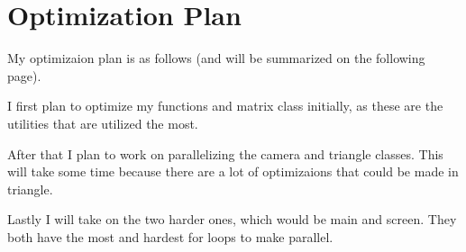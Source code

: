 \chapter*{Optimization Plan}

My optimizaion plan is as follows (and will be summarized on the following page).

I first plan to optimize my functions and matrix class initially, as these are the utilities that are utilized the most. 

After that I plan to work on parallelizing the camera and triangle classes. This will take some time because there are a lot of optimizaions that could be made in triangle. 

Lastly I will take on the two harder ones, which would be main and screen. They both have the most and hardest for loops to make parallel. 
